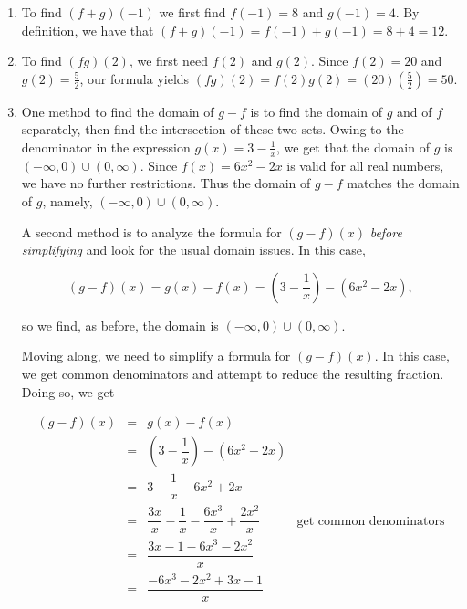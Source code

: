 {
\begin{enumerate}

\item  To find $(f+g)(-1)$ we first find $f(-1) = 8$ and $g(-1) = 4$. By definition, we have that $(f+g)(-1) = f(-1) + g(-1) = 8+4 = 12$.


\item To find $(fg)(2)$, we first need $f(2)$ and $g(2)$. Since $f(2) = 20$ and $g(2) = \frac{5}{2}$, our formula yields $(fg)(2) = f(2) g(2) = (20)\left(\frac{5}{2}\right) = 50$.

\item One method to find the domain of $g-f$ is to find the domain of $g$ and of $f$ separately, then find the intersection of these two sets.  Owing to the denominator in the expression $g(x) = 3 - \frac{1}{x}$, we get that the domain of $g$ is $(-\infty, 0) \cup (0, \infty)$.  Since $f(x) = 6x^2-2x$ is valid for all real numbers, we have no further restrictions.  Thus the domain of $g-f$ matches the domain of $g$, namely, $(-\infty, 0) \cup (0, \infty)$.

A second method is to analyze the formula for $(g-f)(x)$ \textit{before simplifying} and look for the usual domain issues.  In this case, 

\[ (g-f)(x) = g(x) - f(x) = \left(3-\dfrac{1}{x}\right) - \left(6x^2 - 2x\right),\]

so we find, as before, the domain is $(-\infty, 0) \cup (0, \infty)$.

Moving along, we need to simplify a formula for $(g-f)(x)$.  In this case, we get common denominators and attempt to reduce the resulting fraction.  Doing so, we get

\[ \begin{array}{rclr}
(g-f)(x) & = & g(x) - f(x) & \\ [5pt]
         & = & \left(3-\dfrac{1}{x}\right) - \left(6x^2 - 2x\right) &\\  [10pt]
         & = & 3 - \dfrac{1}{x} - 6x^2 + 2x & \\  [10pt]
         & = & \dfrac{3x}{x} - \dfrac{1}{x} - \dfrac{6x^3}{x} + \dfrac{2x^2}{x} & \text{get common denominators} \\  [10pt]
         & = & \dfrac{3x - 1 - 6x^3 - 2x^2}{x} & \\  [10pt]
         & = & \dfrac{-6x^3-2x^2+3x-1}{x} & \\   
\end{array}\]         


\end{enumerate}}
